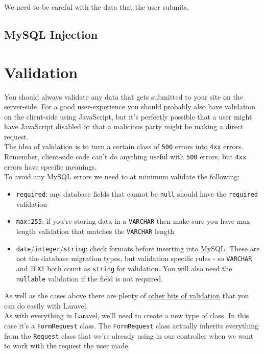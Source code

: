 We need to be careful with the data that the user submits.

\subsection{MySQL Injection}


\section{Validation}
You should always validate any data that gets submitted to your site on the server-side. For a good user-experience you should probably also have validation on the client-side using JavaScript, but it's perfectly possible that a user might have JavaScript disabled or that a malicious party might be making a direct request.
\\

The idea of validation is to turn a certain class of \texttt{500} errors into \texttt{4xx} errors. Remember, client-side code can't do anything useful with \texttt{500} errors, but \texttt{4xx} errors have specific meanings.
\\

To avoid any MySQL errors we need to at minimum validate the following:

\begin{itemize}
    \item \texttt{required}: any database fields that cannot be \texttt{null} should have the \texttt{required} validation
    \item \texttt{max:255}: if you're storing data in a \texttt{VARCHAR} then make sure you have max length validation that matches the \texttt{VARCHAR} length
    \item \texttt{date}/\texttt{integer}/\texttt{string}: check formats before inserting into MySQL. These are not the database migration types, but validation specific rules - so \texttt{VARCHAR} and \texttt{TEXT} both count as \texttt{string} for validation. You will also need the \texttt{nullable} validation if the field is not required.
\end{itemize}

As well as the cases above there are plenty of \href{http://laravel.com/docs/master/validation#available-validation-rules}{other bits of validation} that you can do easily with Laravel.
\\

As with everything in Laravel, we'll need to create a new type of class. In this case it's a \texttt{FormRequest} class. The \texttt{FormRequest} class actually inherits everything from the \texttt{Request} class that we're already using in our controller when we want to work with the request the user made.
\\

